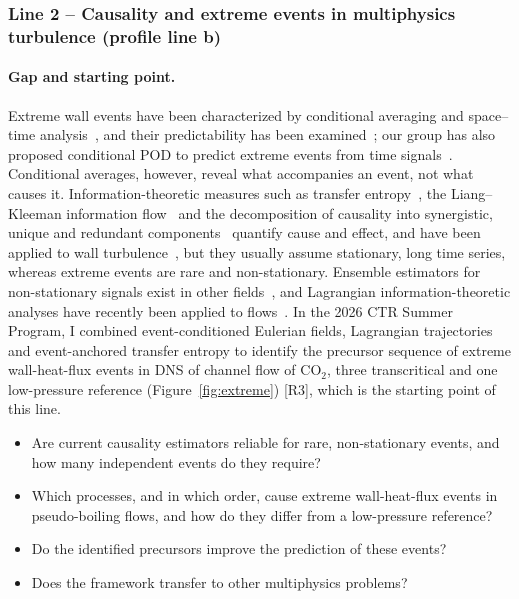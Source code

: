 \documentclass[11pt]{article}
\begin{document}
\subsubsection*{Line 2 -- Causality and extreme events in multiphysics turbulence (profile
line b)}
\paragraph{Gap and starting point.} Extreme wall events have been characterized by conditional
averaging and space--time analysis~\cite{Guerrero2020,Hack2021,Zhang2023}, and their
predictability has been examined~\cite{Blonigan2019}; our group has also proposed conditional POD
to predict extreme events from time signals~\cite{Martin2025}. Conditional averages, however,
reveal what accompanies an event, not what causes it. Information-theoretic measures such as
transfer entropy~\cite{Schreiber2000}, the Liang--Kleeman information flow~\cite{Liang2005} and
the decomposition of causality into synergistic, unique and redundant
components~\cite{MartinezSanchez2024} quantify cause and effect, and have been applied to wall
turbulence~\cite{LozanoDuran2020,Massaro2023,Zhang2026}, but they usually assume stationary,
long time series, whereas extreme events are rare and non-stationary. Ensemble estimators for
non-stationary signals exist in other fields~\cite{Wollstadt2014}, and Lagrangian
information-theoretic analyses have recently been applied to flows~\cite{Jiang2027}. In the 2026
CTR Summer Program, I combined event-conditioned Eulerian fields, Lagrangian trajectories and
event-anchored transfer entropy to identify the precursor sequence of extreme wall-heat-flux
events in DNS of channel flow of CO$_2$, three transcritical and one low-pressure reference
(Figure~\ref{fig:extreme}) [R3], which is the starting point of this line.
\begin{itemize}
  \item[\textbf{Q2.1}] Are current causality estimators reliable for rare, non-stationary
  events, and how many independent events do they require?
  \item[\textbf{Q2.2}] Which processes, and in which order, cause extreme wall-heat-flux
  events in pseudo-boiling flows, and how do they differ from a low-pressure reference?
  \item[\textbf{Q2.3}] Do the identified precursors improve the prediction of these events?
  \item[\textbf{Q2.4}] Does the framework transfer to other multiphysics problems?
\end{itemize}
\end{document}
